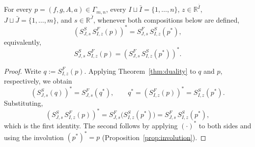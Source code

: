 \begin{corollary}
\label{cor:simultaneous}
For every \(p=(f,g,A,a)\in\Gamma_{m,n}\), every
\(I\sqcup\bar I=\{1,\ldots,n\}\), \(z\in\mathbb R^{\bar I}\),
\(J\sqcup\bar J=\{1,\ldots,m\}\), and \(s\in\mathbb R^{\bar J}\),
whenever both compositions below are defined,
\[
\left(S^{S}_{J,s}\,S^{F}_{I,z}(p)\right)^*
=
S^{F}_{J,s}\,S^{S}_{I,z}(p^*),
\]
equivalently,
\[
S^{S}_{J,s}\,S^{F}_{I,z}(p)
=
\left(S^{F}_{J,s}\,S^{S}_{I,z}(p^*)\right)^*.
\]
\end{corollary}

\begin{proof}
Write \(q:=S^F_{I,z}(p)\). Applying Theorem~\ref{thm:duality} to \(q\) and \(p\), respectively, we obtain
\[
\left(S^S_{J,s}(q)\right)^*=S^F_{J,s}(q^*),
\qquad 
q^*=\left(S^F_{I,z}(p)\right)^*=S^S_{I,z}(p^*).
\]
Substituting,
\[
\left(S^S_{J,s}\,S^F_{I,z}(p)\right)^*
=
S^F_{J,s}\bigl(S^S_{I,z}(p^*)\bigr)
=
S^F_{J,s}\,S^S_{I,z}(p^*),
\]
which is the first identity. The second follows by applying
\((\cdot)^*\) to both sides and using the involution \((p^*)^*=p\)
(Proposition~\ref{prop:involution}).
\end{proof}

